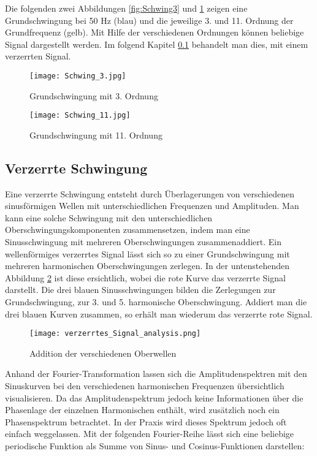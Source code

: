 Die folgenden zwei Abbildungen \ref{fig:Schwing3} und \ref{fig:Schwing11} zeigen eine Grundschwingung bei 50 Hz (blau) und die jeweilige 3. und 11. Ordnung der Grundfrequenz (gelb). Mit Hilfe der verschiedenen Ordnungen können beliebige Signal dargestellt werden. Im folgend Kapitel \ref{sec:Verzerrte_Schwingung} behandelt man dies, mit einem verzerrten Signal. 

\begin{figure}[ht!]
	\begin{minipage}[t]{0.49\textwidth}
		\centering
		\texttt{[image: Schwing\_3.jpg]}	
		\caption{Grundschwingung mit 3. Ordnung \cite{Oberwellen}}\label{fig:Schwing3}
	\end{minipage}	
	\begin{minipage}[t]{0.49\textwidth}	
		\centering	
		\texttt{[image: Schwing\_11.jpg]}	
		\caption{Grundschwingung mit 11. Ordnung \cite{Oberwellen}}\label{fig:Schwing11}
	\end{minipage}
\end{figure}



\subsection{Verzerrte Schwingung}\label{sec:Verzerrte_Schwingung}
Eine verzerrte Schwingung entsteht durch Überlagerungen von verschiedenen sinusförmigen Wellen mit unterschiedlichen Frequenzen und Amplituden. Man kann eine solche Schwingung mit den unterschiedlichen Oberschwingungskomponenten zusammensetzen, indem man eine Sinusschwingung mit mehreren Oberschwingungen zusammenaddiert. Ein wellenförmiges verzerrtes Signal lässt sich so zu einer Grundschwingung mit mehreren harmonischen Oberschwingungen zerlegen. In der untenstehenden Abbildung \ref{fig:Addition Oberwellen} ist diese ersichtlich, wobei die rote Kurve das verzerrte Signal darstellt. Die drei blauen Sinusschwingungen bilden die Zerlegungen zur Grundschwingung, zur 3. und 5. harmonische Oberschwingung. Addiert man die drei blauen Kurven zusammen, so erhält man wiederum das verzerrte rote Signal.
\newpage
\begin{figure}[ht!]
	\centering
	\texttt{[image: verzerrtes\_Signal\_analysis.png]}	
	\caption{Addition der verschiedenen Oberwellen \cite{analysi3}}\label{fig:Addition Oberwellen}
\end{figure}

Anhand der Fourier-Transformation lassen sich die Amplitudenspektren mit den Sinuskurven bei den verschiedenen harmonischen Frequenzen übersichtlich visualisieren. Da das Amplitudenspektrum jedoch keine Informationen über die Phasenlage der einzelnen Harmonischen enthält, wird zusätzlich noch ein Phasenspektrum betrachtet. In der Praxis wird dieses Spektrum jedoch oft einfach weggelassen. Mit der folgenden Fourier-Reihe lässt sich eine beliebige periodische Funktion als Summe von Sinus- und Cosinus-Funktionen darstellen:

